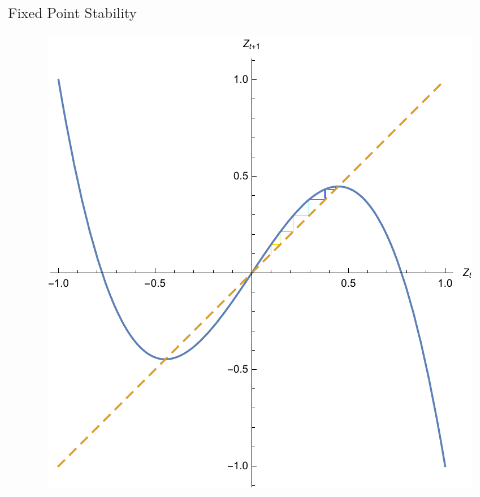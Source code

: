 \documentclass{beamer}
\begin{document}
\begin{frame}{Fixed Point Stability}
	\begin{figure}
		\centering
		\includegraphics[height=0.9\textheight]{fixed_point.pdf}
	\end{figure}
\end{frame}
\end{document}
